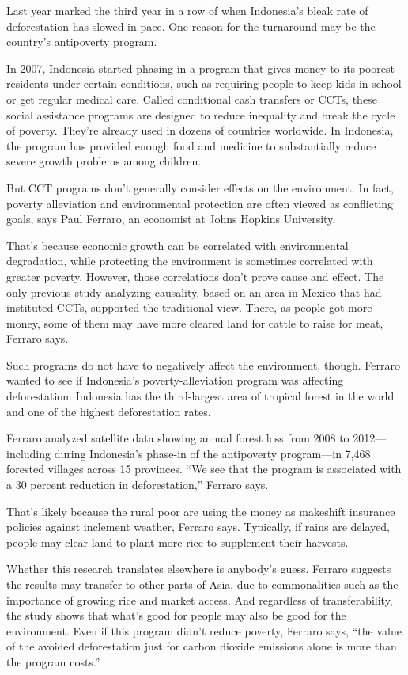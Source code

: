 Last year marked the third year in a row of when Indonesia's bleak rate of deforestation has slowed in pace. One reason for the turnaround may be the country's antipoverty program.


In 2007, Indonesia started phasing in a program that gives money to its poorest residents under certain conditions, such as requiring people to keep kids in school or get regular medical care. Called conditional cash transfers or CCTs, these social assistance programs are designed to reduce inequality and break the cycle of poverty. They're already used in dozens of countries worldwide. In Indonesia, the program has provided enough food and medicine to substantially reduce severe growth problems among children.


But CCT programs don't generally consider effects on the environment. In fact, poverty alleviation and environmental protection are often viewed as conflicting goals, says Paul Ferraro, an economist at Johns Hopkins University.


That's because economic growth can be correlated with environmental degradation, while protecting the environment is sometimes correlated with greater poverty. However, those correlations don't prove cause and effect. The only previous study analyzing causality, based on an area in Mexico that had instituted CCTs, supported the traditional view. There, as people got more money, some of them may have more cleared land for cattle to raise for meat, Ferraro says.


Such programs do not have to negatively affect the environment, though. Ferraro wanted to see if Indonesia's poverty-alleviation program was affecting deforestation. Indonesia has the third-largest area of tropical forest in the world and one of the highest deforestation rates.


Ferraro analyzed satellite data showing annual forest loss from 2008 to 2012—  including during Indonesia's phase-in of the antipoverty program—in 7,468 forested villages across 15 provinces. ``We see that the program is associated with a 30 percent reduction in deforestation,'' Ferraro says.


That's likely because the rural poor are using the money as makeshift insurance policies against inclement weather, Ferraro says. Typically, if rains are delayed, people may clear land to plant more rice to supplement their harvests.


Whether this research translates elsewhere is anybody's guess. Ferraro suggests the results may transfer to other parts of Asia, due to commonalities such as the importance of growing rice and market access. And regardless of transferability, the study shows that what's good for people may also be good for the environment. Even if this program didn't reduce poverty, Ferraro says, ``the value of the avoided deforestation just for carbon dioxide emissions alone is more than the program costs.''